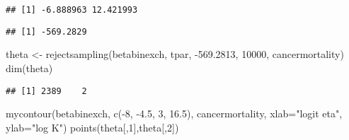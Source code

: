 \documentclass[
]{book}
\newenvironment{Shaded}{\begin{snugshade}}{\end{snugshade}}
\newcommand{\AttributeTok}[1]{\textcolor[rgb]{0.77,0.63,0.00}{#1}}
\newcommand{\DecValTok}[1]{\textcolor[rgb]{0.00,0.00,0.81}{#1}}
\newcommand{\FloatTok}[1]{\textcolor[rgb]{0.00,0.00,0.81}{#1}}
\newcommand{\FunctionTok}[1]{\textcolor[rgb]{0.00,0.00,0.00}{#1}}
\newcommand{\NormalTok}[1]{#1}
\newcommand{\OtherTok}[1]{\textcolor[rgb]{0.56,0.35,0.01}{#1}}
\newcommand{\SpecialCharTok}[1]{\textcolor[rgb]{0.00,0.00,0.00}{#1}}
\newcommand{\StringTok}[1]{\textcolor[rgb]{0.31,0.60,0.02}{#1}}
\begin{document}
\begin{Shaded}
\end{Shaded}

\begin{verbatim}
## [1] -6.888963 12.421993
\end{verbatim}

\begin{Shaded}
\end{Shaded}

\begin{verbatim}
## [1] -569.2829
\end{verbatim}

\begin{Shaded}
\begin{Highlighting}[]
\NormalTok{theta }\OtherTok{\textless{}{-}} \FunctionTok{rejectsampling}\NormalTok{(betabinexch,}
\NormalTok{                        tpar,}
                      \SpecialCharTok{{-}}\FloatTok{569.2813}\NormalTok{, }
                      \DecValTok{10000}\NormalTok{,}
\NormalTok{                      cancermortality)}
\FunctionTok{dim}\NormalTok{(theta)}
\end{Highlighting}
\end{Shaded}

\begin{verbatim}
## [1] 2389    2
\end{verbatim}

\begin{Shaded}
\begin{Highlighting}[]
\FunctionTok{mycontour}\NormalTok{(betabinexch, }
          \FunctionTok{c}\NormalTok{(}\SpecialCharTok{{-}}\DecValTok{8}\NormalTok{, }\SpecialCharTok{{-}}\FloatTok{4.5}\NormalTok{, }\DecValTok{3}\NormalTok{, }\FloatTok{16.5}\NormalTok{), }
\NormalTok{          cancermortality,}
          \AttributeTok{xlab=}\StringTok{"logit eta"}\NormalTok{, }\AttributeTok{ylab=}\StringTok{"log K"}\NormalTok{)}
\FunctionTok{points}\NormalTok{(theta[,}\DecValTok{1}\NormalTok{],theta[,}\DecValTok{2}\NormalTok{])}
\end{Highlighting}
\end{Shaded}
\end{document}
